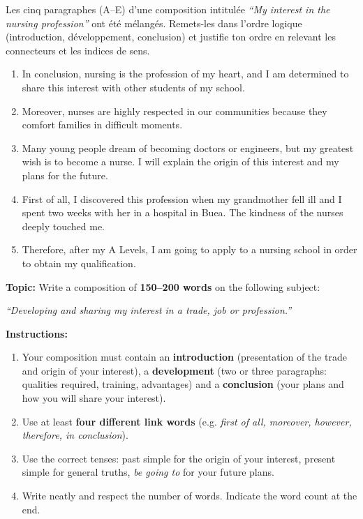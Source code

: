 \documentclass[11pt]{article}
\begin{document}
\begin{exercice}
Les cinq paragraphes (A–E) d'une composition intitulée \emph{“My interest in the nursing profession”} ont été mélangés. Remets-les dans l'ordre logique (introduction, développement, conclusion) et justifie ton ordre en relevant les connecteurs et les indices de sens.

\begin{enumerate}
\item[\textbf{A.}] In conclusion, nursing is the profession of my heart, and I am determined to share this interest with other students of my school.
\item[\textbf{B.}] Moreover, nurses are highly respected in our communities because they comfort families in difficult moments.
\item[\textbf{C.}] Many young people dream of becoming doctors or engineers, but my greatest wish is to become a nurse. I will explain the origin of this interest and my plans for the future.
\item[\textbf{D.}] First of all, I discovered this profession when my grandmother fell ill and I spent two weeks with her in a hospital in Buea. The kindness of the nurses deeply touched me.
\item[\textbf{E.}] Therefore, after my A Levels, I am going to apply to a nursing school in order to obtain my qualification.
\end{enumerate}
\end{exercice}

\begin{exercice}
\textbf{Topic:} Write a composition of \textbf{150–200 words} on the following subject:

\begin{center}
\emph{“Developing and sharing my interest in a trade, job or profession.”}
\end{center}

\textbf{Instructions:}
\begin{enumerate}
\item Your composition must contain an \textbf{introduction} (presentation of the trade and origin of your interest), a \textbf{development} (two or three paragraphs: qualities required, training, advantages) and a \textbf{conclusion} (your plans and how you will share your interest).
\item Use at least \textbf{four different link words} (e.g. \emph{first of all, moreover, however, therefore, in conclusion}).
\item Use the correct tenses: past simple for the origin of your interest, present simple for general truths, \emph{be going to} for your future plans.
\item Write neatly and respect the number of words. Indicate the word count at the end.
\end{enumerate}
\end{exercice}
\end{document}
